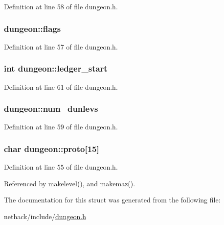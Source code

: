 Definition at line 58 of file dungeon.\+h.

\hypertarget{structdungeon_a24aeb7474605b968237cd46e85f5c9cc}{
\subsubsection[{flags}]{ dungeon\+::flags}}\label{structdungeon_a24aeb7474605b968237cd46e85f5c9cc}


Definition at line 57 of file dungeon.\+h.

\hypertarget{structdungeon_a4af2703b566ea1d670677ec37ab8c128}{
\subsubsection[{ledger\+\_\+start}]{\setlength{\rightskip}{0pt plus 5cm}int dungeon\+::ledger\+\_\+start}}\label{structdungeon_a4af2703b566ea1d670677ec37ab8c128}


Definition at line 61 of file dungeon.\+h.

\hypertarget{structdungeon_ad99ffcd3ebde29f2a6ec11e033d8f43d}{
\subsubsection[{num\+\_\+dunlevs}]{ dungeon\+::num\+\_\+dunlevs}}\label{structdungeon_ad99ffcd3ebde29f2a6ec11e033d8f43d}


Definition at line 59 of file dungeon.\+h.

\hypertarget{structdungeon_a527450844fa8523e5f8a67a93c2a7db6}{
\subsubsection[{proto}]{\setlength{\rightskip}{0pt plus 5cm}char dungeon\+::proto\mbox{[}15\mbox{]}}}\label{structdungeon_a527450844fa8523e5f8a67a93c2a7db6}


Definition at line 55 of file dungeon.\+h.



Referenced by makelevel(), and makemaz().



The documentation for this struct was generated from the following file\+:\begin{DoxyCompactItemize}
\item 
nethack/include/\hyperlink{dungeon_8h}{dungeon.\+h}\end{DoxyCompactItemize}
